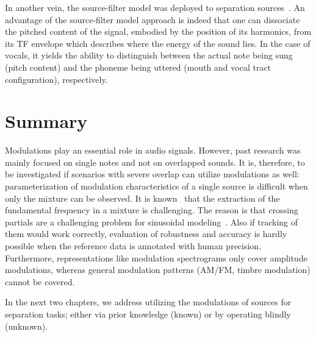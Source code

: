 In another vein, the source-filter model was deployed to separation sources~\cite{hennequin10}.
An advantage of the source-filter model approach is indeed that one can dissociate the pitched content of the signal, embodied by the position of its harmonics, from its TF envelope which describes where the energy of the sound lies. In the case of vocals, it yields the ability to distinguish between the actual note being sung (pitch content) and the phoneme being uttered (mouth and vocal tract configuration), respectively. 

\section{Summary}

Modulations play an essential role in audio signals. 
However, past research was mainly focused on single notes and not on overlapped sounds.
It is, therefore, to be investigated if scenarios with severe overlap can utilize modulations as well: parameterization of modulation characteristics of a single source is difficult when only the mixture can be observed. 
It is known~\cite{salamon13} that the extraction of the fundamental frequency in a mixture is challenging. 
The reason is that crossing partials are a challenging problem for sinusoidal modeling~\cite{viste03}. 
Also if tracking of them would work correctly, evaluation of robustness and accuracy is hardly possible when the reference data is annotated with human precision.
Furthermore, representations like modulation spectrograms only cover amplitude modulations, whereas general modulation patterns (AM/FM, timbre modulation) cannot be covered.
\par
In the next two chapters, we address utilizing the modulations of sources for separation tasks; either via prior knowledge (known) or by operating blindly (unknown).